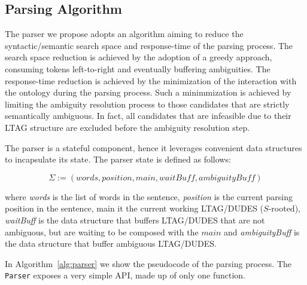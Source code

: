 \subsection{Parsing Algorithm}
\label{sec:parsing-algorithm}

The parser we propose adopts an algorithm aiming to reduce the syntactic/semantic search space and response-time of the parsing process.
%
The search space reduction is achieved by the adoption of a greedy approach, consuming tokens left-to-right and eventually buffering ambiguities.
%
The response-time reduction is achieved by the minimization of the interaction with the ontology during the parsing process. 
%
Such a minimmization is achieved by limiting the ambiguity resolution process to those candidates that are strictly semantically ambiguous.
%
In fact, all candidates that are infeasible due to their LTAG structure are excluded before the ambiguity resolution step. 

The parser is a stateful component, hence it leverages convenient data structures to incapsulate its state.
%
The parser state is defined as follows:

\begin{equation}
\label{eqn:parser-state}
	\Sigma:=(words,position,main,waitBuff,ambiguityBuff)
\end{equation}

where
\textit{words} is the list of words in the sentence,
\textit{position} is the current parsing position in the sentence,
main it the current working LTAG/DUDES ($S$-rooted),
\textit{waitBuff} is the data structure that buffers LTAG/DUDES that are not ambiguous, but are waiting to be composed with the $main$ and 
\textit{ambiguityBuff} is the data structure that buffer ambiguous LTAG/DUDES.

In Algorithm~\ref{alg:parser} we show the pseudocode of the parsing process.
%
The \texttt{Parser} exposes a very simple API, made up of only one function.

